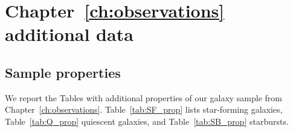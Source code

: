 
\chapter{Chapter~\ref{ch:observations} additional data}


\section{Sample properties} \label{appendix_observations}
We report the Tables with additional properties of our galaxy sample from Chapter~\ref{ch:observations}. Table~\ref{tab:SF_prop} lists star-forming galaxies, Table~\ref{tab:Q_prop}  quiescent galaxies, and Table~\ref{tab:SB_prop} starbursts.

